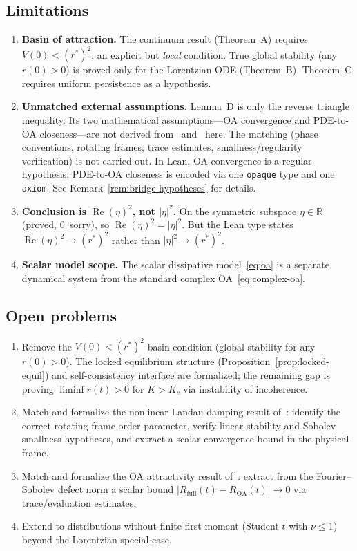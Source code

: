 \documentclass[11pt,a4paper]{article}
\theoremstyle{definition}
\DeclareMathOperator{\re}{Re}
\newcommand{\R}{\mathbb{R}}
\begin{document}
\subsection{Limitations}

\begin{enumerate}
\item \textbf{Basin of attraction.} The continuum result (Theorem~A) requires $V(0) < (r^*)^2$, an explicit but \emph{local} condition. True global stability (any $r(0) > 0$) is proved only for the Lorentzian ODE (Theorem~B). Theorem~C requires uniform persistence as a hypothesis.

\item \textbf{Unmatched external assumptions.} Lemma~D is only the reverse triangle inequality. Its two mathematical assumptions---OA convergence and PDE-to-OA closeness---are not derived from~\cite{dietert2017} and~\cite{dietert-fernandez2018} here. The matching (phase conventions, rotating frames, trace estimates, smallness/regularity verification) is not carried out. In Lean, OA convergence is a regular hypothesis; PDE-to-OA closeness is encoded via one \texttt{opaque} type and one \texttt{axiom}. See Remark~\ref{rem:bridge-hypotheses} for details.

\item \textbf{Conclusion is $\re(\eta)^2$, not $|\eta|^2$.} On the symmetric subspace $\eta \in \R$ (proved, 0~sorry), so $\re(\eta)^2 = |\eta|^2$. But the Lean type states $\re(\eta)^2 \to (r^*)^2$ rather than $|\eta|^2 \to (r^*)^2$.

\item \textbf{Scalar model scope.} The scalar dissipative model~\eqref{eq:oa} is a separate dynamical system from the standard complex OA~\eqref{eq:complex-oa}.
\end{enumerate}

\subsection{Open problems}

\begin{enumerate}
\item Remove the $V(0) < (r^*)^2$ basin condition (global stability for any $r(0) > 0$). The locked equilibrium structure (Proposition~\ref{prop:locked-equil}) and self-consistency interface are formalized; the remaining gap is proving $\liminf r(t) > 0$ for $K > K_c$ via instability of incoherence.
\item Match and formalize the nonlinear Landau damping result of~\cite{dietert2017}: identify the correct rotating-frame order parameter, verify linear stability and Sobolev smallness hypotheses, and extract a scalar convergence bound in the physical frame.
\item Match and formalize the OA attractivity result of~\cite{dietert-fernandez2018}: extract from the Fourier--Sobolev defect norm a scalar bound $|R_{\mathrm{full}}(t) - R_{\mathrm{OA}}(t)| \to 0$ via trace/evaluation estimates.
\item Extend to distributions without finite first moment (Student-$t$ with $\nu \leq 1$) beyond the Lorentzian special case.
\end{enumerate}
\end{document}
